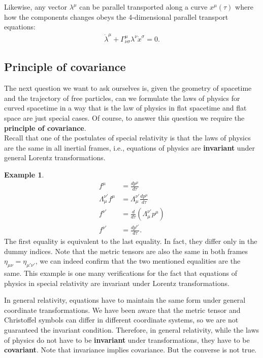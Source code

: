 \documentclass{article}
\theoremstyle{definition}
\newtheorem{exmp}{Example}[section]
\begin{document}
Likewise, any vector $\lambda^\mu$ can be parallel transported along a curve $x^\mu(\tau)$ where how the components changes obeys the 4-dimensional parallel transport equations:
\begin{align*}
\dot{\lambda}^\mu + \Gamma^\mu_{\nu\sigma}\lambda^\nu \dot{x}^\sigma = 0.
\end{align*}

\subsection{Principle of covariance}
The next question we want to ask ourselves is, given the geometry of spacetime and the trajectory of free particles, can we formulate the laws of physics for curved spacetime in a way that is the law of physics in flat spacetime and flat space are just special cases. Of course, to answer this question we require the \textbf{principle of covariance}.\\

Recall that one of the postulates of special relativity is that the laws of physics are the same in all inertial frames, i.e., equations of physics are \textbf{invariant} under general Lorentz transformations.\\
\begin{exmp}
	\begin{align*}
	f^\mu &= \frac{dp^\mu}{d\tau}\\
	\Lambda^{\nu'}_{\mu}f^\mu &= \Lambda^{\nu'}_\mu\frac{dp^\mu}{d\tau} \\
	f^{\nu'} &= \frac{d}{d\tau}\left(\Lambda^{\nu'}_\mu p^\mu \right) \\
	f^{\nu'} &= \frac{dp^{\nu'}}{d\tau}.
	\end{align*}
	The first equality is equivalent to the last equality. In fact, they differ only in the dummy indices. Note that the metric tensors are also the same in both frames $\eta_{\mu\nu} = \eta_{\mu'\nu'}$, we can indeed confirm that the two mentioned equalities are the same. This example is one many verifications for the fact that equations of physics in special relativity are invariant under Lorentz transformations.\\
\end{exmp}

In general relativity, equations have to maintain the same form under general coordinate transformations. We have been aware that the metric tensor and Christoffel symbols can differ in different coordinate systems, so we are not guaranteed the invariant condition. Therefore, in general relativity, while the laws of physics do not have to be \textbf{invariant} under transformations, they have to be \textbf{covariant}. Note that invariance implies covariance. But the converse is not true.\\
\end{document}
